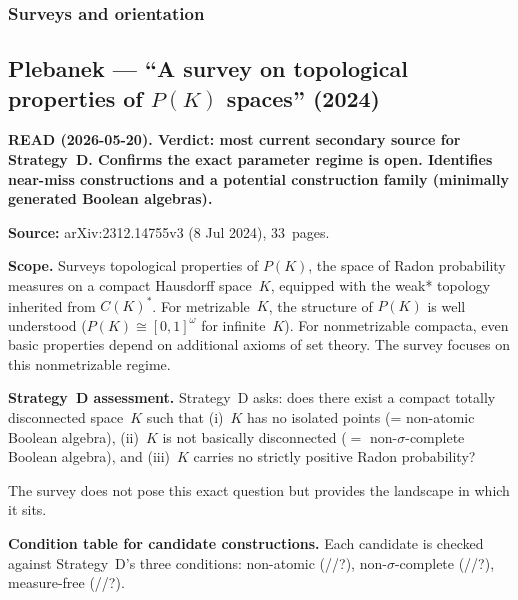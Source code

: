 \subsubsection{Surveys and orientation}

\subsection*{Plebanek --- ``A survey on topological properties of
$P(K)$ spaces'' (2024)}

\textbf{READ (2026-05-20).  Verdict: most current secondary source
for Strategy~D.  Confirms the exact parameter regime is open.
Identifies near-miss constructions and a potential construction
family (minimally generated Boolean algebras).}

\medskip\noindent
\textbf{Source:} arXiv:2312.14755v3 (8 Jul 2024), 33~pages.

\medskip\noindent
\textbf{Scope.}  Surveys topological properties of $P(K)$, the space
of Radon probability measures on a compact Hausdorff space~$K$,
equipped with the weak* topology inherited from $C(K)^*$.  For
metrizable~$K$, the structure of $P(K)$ is well understood ($P(K)
\cong [0,1]^\omega$ for infinite~$K$).  For nonmetrizable compacta,
even basic properties depend on additional axioms of set theory.
The survey focuses on this nonmetrizable regime.

\medskip\noindent
\textbf{Strategy~D assessment.}  Strategy~D asks: does there exist a
compact totally disconnected space~$K$ such that (i)~$K$ has no
isolated points (= non-atomic Boolean algebra), (ii)~$K$ is not
basically disconnected ($=$ non-$\sigma$-complete Boolean algebra),
and (iii)~$K$ carries no strictly positive Radon probability?

The survey does not pose this exact question but provides the
landscape in which it sits.

\medskip\noindent
\textbf{Condition table for candidate constructions.}  Each candidate
is checked against Strategy~D's three conditions: non-atomic
(\checkmark/\texttimes/?), non-$\sigma$-complete
(\checkmark/\texttimes/?), measure-free (\checkmark/\texttimes/?).

